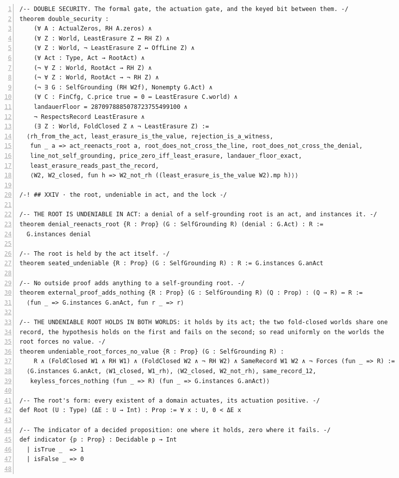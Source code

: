 \documentclass[10pt]{article}
\newcommand{\leansize}{\fontsize{5.5pt}{6.75pt}\selectfont}
\begin{document}
\begin{multicols}{2}
\begin{Verbatim}[numbers=left,firstnumber=1,numbersep=3pt,xleftmargin=2.6em,breaklines=true,breakanywhere=true,breakautoindent=false,breakindent=1.4em,breaksymbolleft={},breakanywheresymbolpre={},fontsize=\leansize]
/-- DOUBLE SECURITY. The formal gate, the actuation gate, and the keyed bit between them. -/
theorem double_security :
    (∀ A : ActualZeros, RH A.zeros) ∧
    (∀ Z : World, LeastErasure Z ↔ RH Z) ∧
    (∀ Z : World, ¬ LeastErasure Z ↔ OffLine Z) ∧
    (∀ Act : Type, Act → RootAct) ∧
    (¬ ∀ Z : World, RootAct → RH Z) ∧
    (¬ ∀ Z : World, RootAct → ¬ RH Z) ∧
    (¬ ∃ G : SelfGrounding (RH W2f), Nonempty G.Act) ∧
    (∀ C : FinCfg, C.price true = 0 ↔ LeastErasure C.world) ∧
    landauerFloor = 2870978885078723755499100 ∧
    ¬ RespectsRecord LeastErasure ∧
    (∃ Z : World, FoldClosed Z ∧ ¬ LeastErasure Z) :=
  ⟨rh_from_the_act, least_erasure_is_the_value, rejection_is_a_witness,
   fun _ a => act_reenacts_root a, root_does_not_cross_the_line, root_does_not_cross_the_denial,
   line_not_self_grounding, price_zero_iff_least_erasure, landauer_floor_exact,
   least_erasure_reads_past_the_record,
   ⟨W2, W2_closed, fun h => W2_not_rh ((least_erasure_is_the_value W2).mp h)⟩⟩

/-! ## XXIV · the root, undeniable in act, and the lock -/

/-- THE ROOT IS UNDENIABLE IN ACT: a denial of a self-grounding root is an act, and instances it. -/
theorem denial_reenacts_root {R : Prop} (G : SelfGrounding R) (denial : G.Act) : R :=
  G.instances denial

/-- The root is held by the act itself. -/
theorem seated_undeniable {R : Prop} (G : SelfGrounding R) : R := G.instances G.anAct

/-- No outside proof adds anything to a self-grounding root. -/
theorem external_proof_adds_nothing {R : Prop} (G : SelfGrounding R) (Q : Prop) : (Q → R) ↔ R :=
  ⟨fun _ => G.instances G.anAct, fun r _ => r⟩

/-- THE UNDENIABLE ROOT HOLDS IN BOTH WORLDS: it holds by its act; the two fold-closed worlds share one
record, the hypothesis holds on the first and fails on the second; so read uniformly on the worlds the
root forces no value. -/
theorem undeniable_root_forces_no_value {R : Prop} (G : SelfGrounding R) :
    R ∧ (FoldClosed W1 ∧ RH W1) ∧ (FoldClosed W2 ∧ ¬ RH W2) ∧ SameRecord W1 W2 ∧ ¬ Forces (fun _ => R) :=
  ⟨G.instances G.anAct, ⟨W1_closed, W1_rh⟩, ⟨W2_closed, W2_not_rh⟩, same_record_12,
   keyless_forces_nothing (fun _ => R) (fun _ => G.instances G.anAct)⟩

/-- The root's form: every existent of a domain actuates, its actuation positive. -/
def Root (U : Type) (ΔE : U → Int) : Prop := ∀ x : U, 0 < ΔE x

/-- The indicator of a decided proposition: one where it holds, zero where it fails. -/
def indicator {p : Prop} : Decidable p → Int
  | isTrue _  => 1
  | isFalse _ => 0


\end{Verbatim}
\end{multicols}
\end{document}
